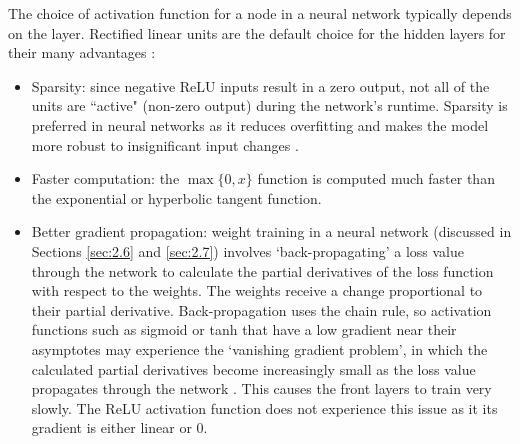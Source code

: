 \documentclass[honours,12pt]{unswthesis}
\numberwithin{equation}{section}
\theoremstyle{definition}
\begin{document}
The choice of activation function for a node in a neural network typically depends on the layer. Rectified linear units are the default choice for the hidden layers for their many advantages \citep{DeepLearning}:
\begin{itemize}
\item Sparsity: since negative ReLU inputs result in a zero output, not all of the units are ``active" (non-zero output) during the network's runtime. Sparsity is preferred in neural networks as it reduces overfitting and makes the model more robust to insignificant input changes \citep{sparse}.
\item Faster computation: the $\max\{0,x\}$ function is computed much faster than the exponential or hyperbolic tangent function.
\item Better gradient propagation: weight training in a neural network (discussed in Sections \ref{sec:2.6} and \ref{sec:2.7}) involves `back-propagating' a loss value through the network to calculate the partial derivatives of the loss function with respect to the weights. The weights receive a change proportional to their partial derivative. Back-propagation uses the chain rule, so activation functions such as sigmoid or tanh that have a low gradient near their asymptotes may experience the `vanishing gradient problem', in which the calculated partial derivatives become increasingly small as the loss value propagates through the network \citep{kolen}. This causes the front layers to train very slowly. The ReLU activation function does not experience this issue as it its gradient is either linear or $0$.
\end{itemize}
\end{document}
